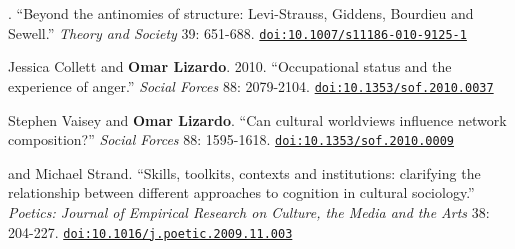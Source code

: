 
. ``Beyond the antinomies of structure: Levi-Strauss, Giddens, Bourdieu and Sewell.''  {\em Theory and Society} 39:  651-688. \href{https://doi.org/10.1007/s11186-010-9125-1}{\nolinkurl{doi:10.1007/s11186-010-9125-1}}

\ind Jessica Collett and {\bf Omar Lizardo}. 2010. ``Occupational status and the experience of anger.''  {\em Social Forces} 88: 2079-2104. \href{https://doi.org/10.1353/sof.2010.0037}{\nolinkurl{doi:10.1353/sof.2010.0037}}

\ind Stephen Vaisey and {\bf Omar Lizardo}. ``Can cultural worldviews influence network composition?''  {\em Social Forces} 88: 1595-1618. \href{https://doi.org/10.1353/sof.2010.0009}{\nolinkurl{doi:10.1353/sof.2010.0009}}

 and Michael Strand. ``Skills, toolkits, contexts and institutions: clarifying the relationship between different approaches to  cognition in cultural sociology.''  {\em Poetics: Journal of Empirical Research on Culture, the Media and the Arts} 38: 204-227. \href{https://doi.org/10.1016/j.poetic.2009.11.003}{\nolinkurl{doi:10.1016/j.poetic.2009.11.003}}
